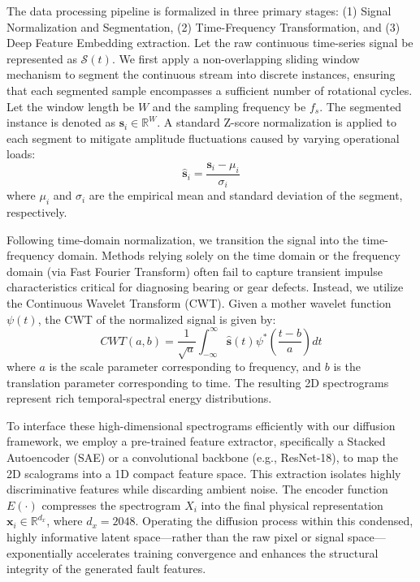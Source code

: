 The data processing pipeline is formalized in three primary stages: (1) Signal Normalization and Segmentation, (2) Time-Frequency Transformation, and (3) Deep Feature Embedding extraction. Let the raw continuous time-series signal be represented as $\mathcal{S}(t)$. We first apply a non-overlapping sliding window mechanism to segment the continuous stream into discrete instances, ensuring that each segmented sample encompasses a sufficient number of rotational cycles. Let the window length be $W$ and the sampling frequency be $f_s$. The segmented instance is denoted as $\mathbf{s}_i \in \mathbb{R}^W$. A standard Z-score normalization is applied to each segment to mitigate amplitude fluctuations caused by varying operational loads:
\begin{equation}
\hat{\mathbf{s}}_i = \frac{\mathbf{s}_i - \mu_i}{\sigma_i}
\end{equation}
where $\mu_i$ and $\sigma_i$ are the empirical mean and standard deviation of the segment, respectively.

Following time-domain normalization, we transition the signal into the time-frequency domain. Methods relying solely on the time domain or the frequency domain (via Fast Fourier Transform) often fail to capture transient impulse characteristics critical for diagnosing bearing or gear defects. Instead, we utilize the Continuous Wavelet Transform (CWT). Given a mother wavelet function $\psi(t)$, the CWT of the normalized signal is given by:
\begin{equation}
CWT(a, b) = \frac{1}{\sqrt{a}} \int_{-\infty}^{\infty} \hat{\mathbf{s}}(t) \psi^*\left(\frac{t-b}{a}\right) dt
\end{equation}
where $a$ is the scale parameter corresponding to frequency, and $b$ is the translation parameter corresponding to time. The resulting 2D spectrograms represent rich temporal-spectral energy distributions.

To interface these high-dimensional spectrograms efficiently with our diffusion framework, we employ a pre-trained feature extractor, specifically a Stacked Autoencoder (SAE) or a convolutional backbone (e.g., ResNet-18), to map the 2D scalograms into a 1D compact feature space. This extraction isolates highly discriminative features while discarding ambient noise. The encoder function $E(\cdot)$ compresses the spectrogram $X_i$ into the final physical representation $\mathbf{x}_i \in \mathbb{R}^{d_x}$, where $d_x = 2048$. Operating the diffusion process within this condensed, highly informative latent space---rather than the raw pixel or signal space---exponentially accelerates training convergence and enhances the structural integrity of the generated fault features.

